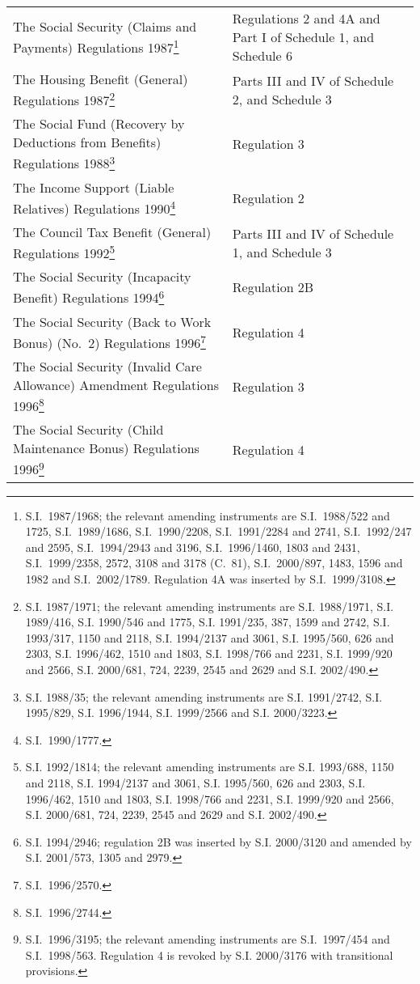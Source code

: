 \documentclass[12pt,a4paper]{article}
\begin{document}
{\begin{longtable}{p{204.69023pt}p{161.3082pt}}
The Social Security (Claims and Payments) Regulations 1987\footnote{S.I.\ 1987/1968; the relevant amending instruments are S.I.\ 1988/522 and 1725, S.I.\ 1989/1686, S.I.\ 1990/2208, S.I.\ 1991/2284 and 2741, S.I.\ 1992/247 and 2595, S.I.\ 1994/2943 and 3196, S.I.\ 1996/1460, 1803 and 2431, S.I.\ 1999/2358, 2572, 3108 and 3178 (C.\ 81), S.I.\ 2000/897, 1483, 1596 and 1982 and S.I.\ 2002/1789. Regulation 4A was inserted by S.I.\ 1999/3108.}	&Regulations 2 and 4A and Part I of Schedule 1, and Schedule 6\\
The Housing Benefit (General) Regulations 1987\footnote{\frenchspacing S.I. 1987/1971; the relevant amending instruments are S.I. 1988/1971, S.I. 1989/416, S.I. 1990/546 and 1775, S.I. 1991/235, 387, 1599 and 2742, S.I. 1993/317, 1150 and 2118, S.I. 1994/2137 and 3061, S.I. 1995/560, 626 and 2303, S.I. 1996/462, 1510 and 1803, S.I. 1998/766 and 2231, S.I. 1999/920 and 2566, S.I. 2000/681, 724, 2239, 2545 and 2629 and S.I. 2002/490.}	&Parts III and IV of Schedule 2, and Schedule 3\\
The Social Fund (Recovery by Deductions from Benefits) Regulations 1988\footnote{\frenchspacing S.I. 1988/35; the relevant amending instruments are S.I. 1991/2742, S.I. 1995/829, S.I. 1996/1944, S.I. 1999/2566 and S.I. 2000/3223.}	&Regulation 3\\
The Income Support (Liable Relatives) Regulations 1990\footnote{S.I.\ 1990/1777.}	&Regulation 2\\
The Council Tax Benefit (General) Regulations 1992\footnote{\frenchspacing S.I. 1992/1814; the relevant amending instruments are S.I. 1993/688, 1150 and 2118, S.I. 1994/2137 and 3061, S.I. 1995/560, 626 and 2303, S.I. 1996/462, 1510 and 1803, S.I. 1998/766 and 2231, S.I. 1999/920 and 2566, S.I. 2000/681, 724, 2239, 2545 and 2629 and S.I. 2002/490.}	&Parts III and IV of Schedule 1, and Schedule 3\\
The Social Security (Incapacity Benefit) Regulations 1994\footnote{\frenchspacing S.I. 1994/2946; regulation 2B was inserted by S.I. 2000/3120 and amended by S.I. 2001/573, 1305 and 2979.}	&Regulation 2B\\
The Social Security (Back to Work Bonus) (No.\ 2) Regulations 1996\footnote{S.I.\ 1996/2570.}	&Regulation 4\\
The Social Security (Invalid Care Allowance) Amendment Regulations 1996\footnote{S.I.\ 1996/2744.}&	Regulation 3\\
The Social Security (Child Maintenance Bonus) Regulations 1996\footnote{S.I.\ 1996/3195; the relevant amending instruments are S.I.\ 1997/454 and S.I.\ 1998/563. Regulation 4 is revoked by S.I. 2000/3176 with transitional provisions.}	&Regulation 4\\

\end{longtable}}
\end{document}
